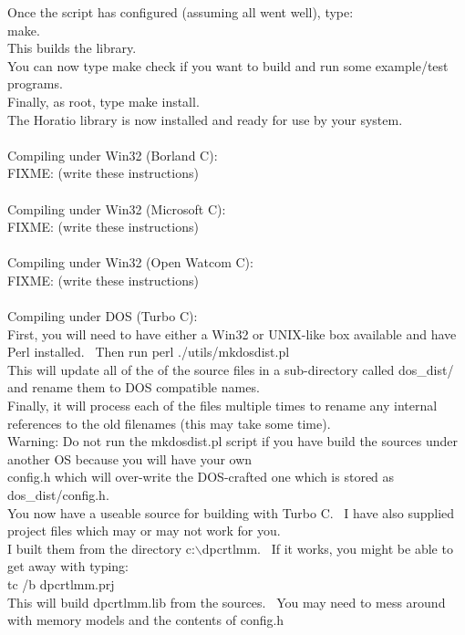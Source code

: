 \documentclass{article}
\begin{document}
Once the script has configured
(assuming all went well), type:\\
make.\\
This builds the library.\\
You can now type make check if you
want to build and run some
example/test programs.\\
Finally, as root, type make
install.\\
The Horatio library is now
installed and ready for use by your system.\\
\\
Compiling under Win32 (Borland C):\\
FIXME: (write these instructions)\\
\\
Compiling under Win32 (Microsoft C):\\
FIXME: (write these instructions)\\
\\
Compiling under Win32 (Open Watcom C):\\
FIXME: (write these instructions)\\
\\
Compiling under DOS (Turbo C):\\
First, you will need to have
either a Win32 or UNIX-like box available and have Perl
installed.~ Then run perl ./utils/mkdosdist.pl\\
This will update all of the of the source files in a sub-directory
called dos\_dist/ and rename them to DOS compatible names.\\
Finally, it will process each of the files multiple times to rename any
internal references to the old filenames (this may take some time).\\
Warning: Do not run the mkdosdist.pl script if you have build the
sources under another OS because you will have your own\\
config.h which will over-write the DOS-crafted one which is stored as
dos\_dist/config.h.\\
You now have a useable source for building with Turbo C.~ I have
also supplied project files which may or may not work for you.\\
I built them from the directory c:$\backslash$dpcrtlmm.~ If it works, you
might be able to get away with typing:\\
tc /b dpcrtlmm.prj\\
This will build dpcrtlmm.lib from the sources.~ You may need to
mess around with memory models and the contents of config.h\\
\end{document}
